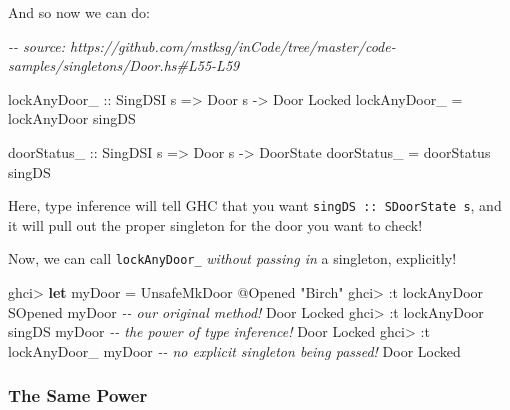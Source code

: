 \documentclass[]{article}
\newenvironment{Shaded}{}{}
\newcommand{\CommentTok}[1]{\textcolor[rgb]{0.38,0.63,0.69}{\textit{#1}}}
\newcommand{\DataTypeTok}[1]{\textcolor[rgb]{0.56,0.13,0.00}{#1}}
\newcommand{\KeywordTok}[1]{\textcolor[rgb]{0.00,0.44,0.13}{\textbf{#1}}}
\newcommand{\NormalTok}[1]{#1}
\newcommand{\OperatorTok}[1]{\textcolor[rgb]{0.40,0.40,0.40}{#1}}
\newcommand{\OtherTok}[1]{\textcolor[rgb]{0.00,0.44,0.13}{#1}}
\newcommand{\StringTok}[1]{\textcolor[rgb]{0.25,0.44,0.63}{#1}}
\begin{document}
And so now we can do:

\begin{Shaded}
\begin{Highlighting}[]
\CommentTok{{-}{-} source: https://github.com/mstksg/inCode/tree/master/code{-}samples/singletons/Door.hs\#L55{-}L59}

\OtherTok{lockAnyDoor\_ ::} \DataTypeTok{SingDSI}\NormalTok{ s }\OtherTok{=>} \DataTypeTok{Door}\NormalTok{ s }\OtherTok{{-}>} \DataTypeTok{Door} \DataTypeTok{\textquotesingle{}Locked}
\NormalTok{lockAnyDoor\_ }\OtherTok{=}\NormalTok{ lockAnyDoor singDS}

\OtherTok{doorStatus\_ ::} \DataTypeTok{SingDSI}\NormalTok{ s }\OtherTok{=>} \DataTypeTok{Door}\NormalTok{ s }\OtherTok{{-}>} \DataTypeTok{DoorState}
\NormalTok{doorStatus\_ }\OtherTok{=}\NormalTok{ doorStatus singDS}
\end{Highlighting}
\end{Shaded}

Here, type inference will tell GHC that you want
\texttt{singDS\ ::\ SDoorState\ s}, and it will pull out the proper singleton
for the door you want to check!

Now, we can call \texttt{lockAnyDoor\_} \emph{without passing in} a singleton,
explicitly!

\begin{Shaded}
\begin{Highlighting}[]
\NormalTok{ghci}\OperatorTok{>} \KeywordTok{let}\NormalTok{ myDoor }\OtherTok{=} \DataTypeTok{UnsafeMkDoor} \OperatorTok{@}\DataTypeTok{\textquotesingle{}Opened} \StringTok{"Birch"}
\NormalTok{ghci}\OperatorTok{>} \OperatorTok{:}\NormalTok{t lockAnyDoor }\DataTypeTok{SOpened}\NormalTok{ myDoor }\CommentTok{{-}{-} our original method!}
\DataTypeTok{Door} \DataTypeTok{\textquotesingle{}Locked}
\NormalTok{ghci}\OperatorTok{>} \OperatorTok{:}\NormalTok{t lockAnyDoor singDS myDoor  }\CommentTok{{-}{-} the power of type inference!}
\DataTypeTok{Door} \DataTypeTok{\textquotesingle{}Locked}
\NormalTok{ghci}\OperatorTok{>} \OperatorTok{:}\NormalTok{t lockAnyDoor\_ myDoor        }\CommentTok{{-}{-} no explicit singleton being passed!}
\DataTypeTok{Door} \DataTypeTok{\textquotesingle{}Locked}
\end{Highlighting}
\end{Shaded}

\hypertarget{the-same-power}{%
\subsubsection{The Same Power}\label{the-same-power}}
\end{document}
